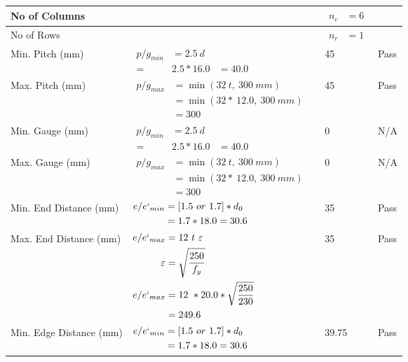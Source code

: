 \documentclass{article}%
\begin{document}
\begin{longtable}{|p{2.5cm}|p{5.5cm}|p{7cm}|p{1cm}|}
\hline%
No of Columns&&$\begin{aligned} n_c &=6 \end{aligned}$&\\%
\hline%
No of Rows&&$\begin{aligned} n_r &=1 \end{aligned}$&\\%
\hline%
Min. Pitch (mm)&$\begin{aligned}p/g_{min}&= 2.5 ~ d&\\ =&2.5*16.0&=40.0\end{aligned}$&45&Pass\\%
\hline%
Max. Pitch (mm)&$\begin{aligned}p/g_{max} &=\min(32~t,~300~mm)&\\ &=\min(32 *~12.0,~ 300 ~mm)\\&=300\end{aligned}$&45&Pass\\%
\hline%
Min. Gauge (mm)&$\begin{aligned}p/g_{min}&= 2.5 ~ d&\\ =&2.5*16.0&=40.0\end{aligned}$&0&N/A\\%
\hline%
Max. Gauge (mm)&$\begin{aligned}p/g_{max} &=\min(32~t,~300~mm)&\\ &=\min(32 *~12.0,~ 300 ~mm)\\&=300\end{aligned}$&0&N/A\\%
\hline%
Min. End Distance (mm)&$\begin{aligned}e/e`_{min} &=[1.5~or~ 1.7] * d_0\\ &=1.7*18.0=30.6 \end{aligned}$&35&Pass\\%
\hline%
Max. End Distance (mm)&$\begin{aligned}e/e`_{max} &= 12~ t~ \varepsilon&\\ \varepsilon &= \sqrt{\frac{250}{f_y}}\\ e/e`_{max}&=12 ~*20.0*\sqrt{\frac{250}{230}}\\ &=249.6\\ \end{aligned}$&35&Pass\\%
\hline%
Min. Edge Distance (mm)&$\begin{aligned}e/e`_{min} &=[1.5~or~ 1.7] * d_0\\ &=1.7*18.0=30.6 \end{aligned}$&39.75&Pass\\%

\end{longtable}
\end{document}
